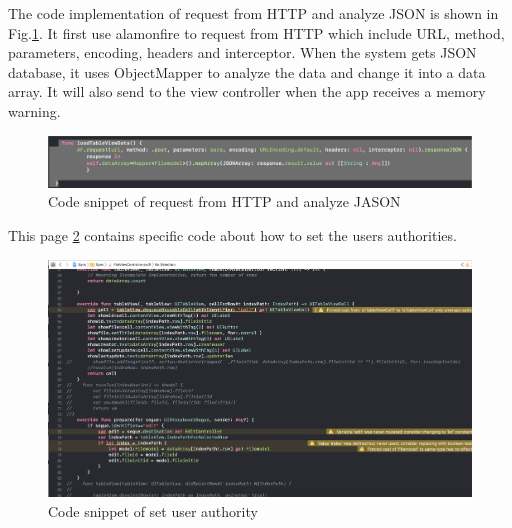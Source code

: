 \noindent The code implementation of request from HTTP and analyze JSON is shown in Fig.\ref{png12}. It first use alamonfire to request from HTTP which include URL, method, parameters, encoding, headers and interceptor. When the system gets JSON database, it uses ObjectMapper to analyze the data and change it into a data array. It will also send to the view controller when the app receives a memory warning.

\begin{figure}[H]
  \centering
  \includegraphics[width=.8\textwidth]{ios.png} %
  \caption{Code snippet of request from HTTP and analyze JASON} %
  \label{png12} %
\end{figure}




\vspace{0.3cm}
\noindent This page \ref{pss} contains specific code about how to set the users authorities.
\begin{figure}[H]
  \centering
  \includegraphics[width=.8\textwidth]{fv.png} %
  \caption{Code snippet of set user authority} %
  \label{pss} %
\end{figure}

